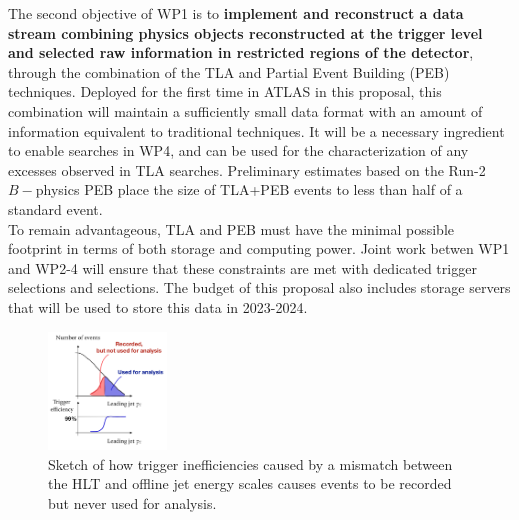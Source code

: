 The second objective of WP1 is to \textbf{implement and reconstruct a data stream combining physics objects reconstructed at the trigger level and selected raw information in restricted regions of the detector}, through the combination of the TLA and Partial Event Building (PEB) techniques. 
Deployed for the first time in ATLAS in this proposal, this combination will maintain a sufficiently small data format with an amount of information equivalent to traditional techniques. 
It will be a necessary ingredient to enable searches in WP4, and can be used for the characterization of any excesses observed in TLA searches. 
Preliminary estimates based on the Run-2 $B-$physics PEB %
place the size of TLA+PEB events to less than half of a standard event. \\
\indent
To remain advantageous, TLA and PEB must have the minimal possible footprint in terms of both storage and computing power. 
Joint work betwen WP1 and WP2-4 will ensure that these constraints are met with dedicated trigger selections and selections.   
The budget of this proposal also includes storage servers that will be used to store this data in 2023-2024. 

\begin{figure} 
\begin{center}
\includegraphics[width=0.28\textwidth]{figs_B2/efficiencySketch}
\caption{\color{black}\label{fig:wastedRate} \small Sketch of how trigger inefficiencies caused by a mismatch between the HLT and offline jet energy scales causes events to be recorded but never used for analysis.} %
\end{center}
\vskip-5pt
\end{figure}

